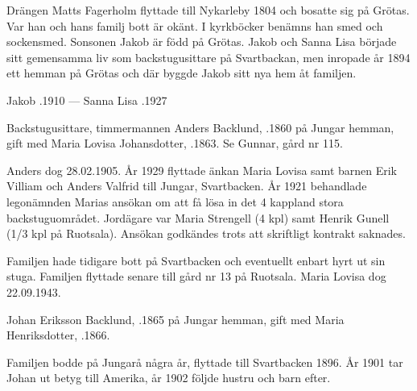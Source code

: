 Drängen Matts Fagerholm flyttade till Nykarleby 1804 och bosatte sig på Grötas. Var han och hans familj bott är okänt. I kyrkböcker benämns han smed och sockensmed. Sonsonen Jakob är född på Grötas. Jakob och Sanna Lisa började sitt gemensamma liv som backstugusittare på Svartbackan, men inropade år 1894 ett hemman på Grötas och där byggde Jakob sitt nya hem åt familjen.

Jakob .1910  ---  Sanna Lisa .1927




%


%
Backstugusittare, timmermannen Anders Backlund, .1860 på Jungar hemman, gift med Maria Lovisa Johansdotter, .1863. Se Gunnar, gård nr 115.

Anders dog 28.02.1905. År 1929 flyttade änkan Maria Lovisa samt barnen Erik Villiam och Anders Valfrid till Jungar, Svartbacken. År 1921 behandlade legonämnden Marias ansökan om att få lösa in det 4 kappland stora backstuguområdet. Jordägare var Maria Strengell (4 kpl) samt Henrik Gunell (1/3 kpl på Ruotsala). Ansökan godkändes trots att skriftligt kontrakt saknades.

Familjen hade tidigare bott på Svartbacken och eventuellt enbart hyrt ut sin stuga. Familjen flyttade senare till gård nr 13 på Ruotsala. Maria Lovisa dog 22.09.1943.


%
Johan Eriksson Backlund, .1865 på Jungar hemman, gift med Maria Henriksdotter, .1866.
\begin{jhchildren}
  \item {}
  \item {}
  \item {}
  \item {}
  \item {}
  \item {}
\end{jhchildren}
Familjen bodde på Jungarå några år, flyttade till Svartbacken 1896. År 1901 tar Johan ut betyg till Amerika, år 1902 följde hustru och barn efter.



